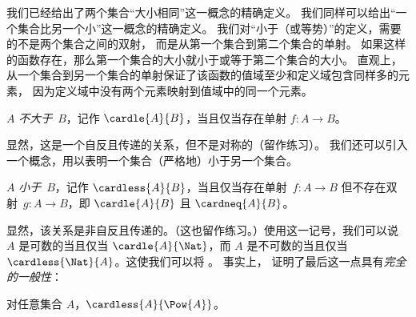 \documentclass[../../../include/open-logic-section]{subfiles}
\begin{document}


\begin{explain}
我们已经给出了两个集合“大小相同”这一概念的精确定义。
我们同样可以给出“一个集合比另一个小”这一概念的精确定义。
我们对“小于（或等势）”的定义，需要的不是两个集合之间的双射，
而是从第一个集合到第二个集合的单射。
如果这样的函数存在，那么第一个集合的大小就小于或等于第二个集合的大小。
直观上，从一个集合到另一个集合的单射保证了该函数的值域至少和定义域包含同样多的元素，
因为定义域中没有两个元素映射到值域中的同一个元素。
\end{explain}

\begin{defn}
$A$ \emph{不大于}~$B$，记作 $\cardle{A}{B}$，当且仅当存在单射 $f \colon A \to B$。
\end{defn}

显然，这是一个自反且传递的关系，但不是对称的（留作练习）。
我们还可以引入一个概念，用以表明一个集合（严格地）小于另一个集合。

\begin{defn}
$A$ \emph{小于}~$B$，记作 $\cardless{A}{B}$，当且仅当存在单射~$f\colon A \to B$ 但不存在双射~$g\colon A
\to B$，即 $\cardle{A}{B}$ 且 $\cardneq{A}{B}$。
\end{defn}

显然，该关系是非自反且传递的。（这也留作练习。）使用这一记号，我们可以说 $A$ 是可数的当且仅当 $\cardle{A}{\Nat}$，而 $A$ 是不可数的当且仅当 $\cardless{\Nat}{A}$。这使我们可以将
。
事实上，\citet{Cantor1892} 证明了最后这一点具有\emph{完全的一般性}：

\begin{thm}[Cantor]
对任意集合 $A$，$\cardless{A}{\Pow{A}}$。
\end{thm}
\end{document}
